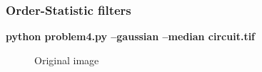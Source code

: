 \pagebreak
\subsubsection{Order-Statistic filters}

\begin{minipage}{\textwidth}
\textbf{python problem4.py --gaussian --median circuit.tif} \\
\end{minipage}

\begin{figure}[!htb]\centering
    \begin{minipage}{0.45\textwidth}
        \caption{\small{Original image}}
    \end{minipage}
    \begin{minipage}{0.45\textwidth}

\end{minipage}
\end{figure}
